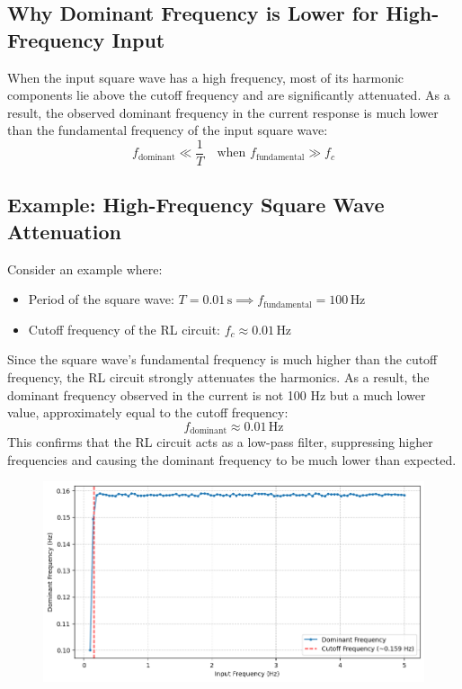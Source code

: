 \begin{multicols}{2}
\subsection{Why Dominant Frequency is Lower for High-Frequency Input}
When the input square wave has a high frequency, most of its harmonic components lie above the cutoff frequency and are significantly attenuated. As a result, the observed dominant frequency in the current response is much lower than the fundamental frequency of the input square wave:
\begin{equation}
f_{\text{dominant}} \ll \frac{1}{T} \quad \text{when } f_{\text{fundamental}} \gg f_c
\end{equation}

\subsection{Example: High-Frequency Square Wave Attenuation}
Consider an example where:
\begin{itemize}
    \item Period of the square wave: $T = 0.01 \, \text{s} \implies f_{\text{fundamental}} = 100 \, \text{Hz}$
    \item Cutoff frequency of the RL circuit: $f_c \approx 0.01 \, \text{Hz}$
\end{itemize}
Since the square wave's fundamental frequency is much higher than the cutoff frequency, the RL circuit strongly attenuates the harmonics. As a result, the dominant frequency observed in the current is not 100 Hz but a much lower value, approximately equal to the cutoff frequency:
\begin{equation}
f_{\text{dominant}} \approx 0.01 \, \text{Hz}
\end{equation}
This confirms that the RL circuit acts as a low-pass filter, suppressing higher frequencies and causing the dominant frequency to be much lower than expected.
\begin{figure}[H]
  \centering
  \includegraphics[width=\columnwidth]{sections/dominantfreq.png}

\end{figure}
\end{multicols}
